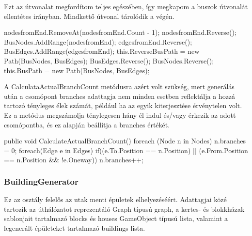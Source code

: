 Ezt az útvonalat megfordítom teljes egészében, így megkapom a buszok útvonalát ellentétes irányban. Mindkettő útvonal tárolódik a végén.
\begin{cpp}
nodesfromEnd.RemoveAt(nodesfromEnd.Count - 1);
nodesfromEnd.Reverse();
BusNodes.AddRange(nodesfromEnd);
edgesfromEnd.Reverse();
BusEdges.AddRange(edgesfromEnd);
this.ReverseBusPath = new Path(BusNodes, BusEdges);
BusEdges.Reverse();
BusNodes.Reverse();
this.BusPath = new Path(BusNodes, BusEdges);
\end{cpp}
A CalculataActualBranchCount metódusra azért volt szükség, mert generálás után a csomópont branches adattagja nem minden esetben reflektálja a hozzá tartozó tényleges élek számát, például ha az egyik kiterjesztése érvénytelen volt. Ez a metódus megszámolja ténylegesen hány él indul és/vagy érkezik az adott csomópontba, és ez alapján beállítja a branches értékét.
\begin{cpp}
public void CalculateActualBranchCount()
        {
            foreach (Node n in Nodes)
            {
                n.branches = 0;
                foreach(Edge e in Edges)
                {
                    if((e.To.Position == n.Position) || 
                    (e.From.Position == n.Position && !e.Oneway))
                    {
                        n.branches++;
                    }
                }
            }
        }
\end{cpp}
\subsubsection{BuildingGenerator}
Ez az osztály felelős az utak menti épületek elhelyezéséért. Adattagjai közé tartozik az úthálózatot reprezentáló Graph típusú graph, a kertes- és blokkházak sablonjait tartalmazó blocks és houses GameObject típusú lista, valamint a legenerált épületeket tartalmazó buildings lista.

